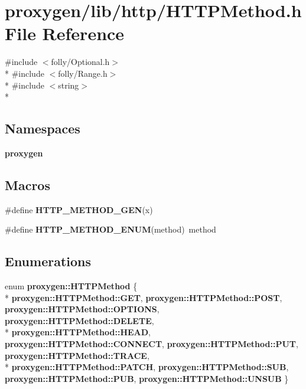\section{proxygen/lib/http/\+H\+T\+T\+P\+Method.h File Reference}
\label{HTTPMethod_8h}
{\ttfamily \#include $<$folly/\+Optional.\+h$>$}\\*
{\ttfamily \#include $<$folly/\+Range.\+h$>$}\\*
{\ttfamily \#include $<$string$>$}\\*
\subsection*{Namespaces}
\begin{DoxyCompactItemize}
\item 
 {\bf proxygen}
\end{DoxyCompactItemize}
\subsection*{Macros}
\begin{DoxyCompactItemize}
\item 
\#define {\bf H\+T\+T\+P\+\_\+\+M\+E\+T\+H\+O\+D\+\_\+\+G\+EN}(x)
\item 
\#define {\bf H\+T\+T\+P\+\_\+\+M\+E\+T\+H\+O\+D\+\_\+\+E\+N\+UM}(method)~method
\end{DoxyCompactItemize}
\subsection*{Enumerations}
\begin{DoxyCompactItemize}
\item 
enum {\bf proxygen\+::\+H\+T\+T\+P\+Method} \{ \\*
{\bf proxygen\+::\+H\+T\+T\+P\+Method\+::\+G\+ET}, 
{\bf proxygen\+::\+H\+T\+T\+P\+Method\+::\+P\+O\+ST}, 
{\bf proxygen\+::\+H\+T\+T\+P\+Method\+::\+O\+P\+T\+I\+O\+NS}, 
{\bf proxygen\+::\+H\+T\+T\+P\+Method\+::\+D\+E\+L\+E\+TE}, 
\\*
{\bf proxygen\+::\+H\+T\+T\+P\+Method\+::\+H\+E\+AD}, 
{\bf proxygen\+::\+H\+T\+T\+P\+Method\+::\+C\+O\+N\+N\+E\+CT}, 
{\bf proxygen\+::\+H\+T\+T\+P\+Method\+::\+P\+UT}, 
{\bf proxygen\+::\+H\+T\+T\+P\+Method\+::\+T\+R\+A\+CE}, 
\\*
{\bf proxygen\+::\+H\+T\+T\+P\+Method\+::\+P\+A\+T\+CH}, 
{\bf proxygen\+::\+H\+T\+T\+P\+Method\+::\+S\+UB}, 
{\bf proxygen\+::\+H\+T\+T\+P\+Method\+::\+P\+UB}, 
{\bf proxygen\+::\+H\+T\+T\+P\+Method\+::\+U\+N\+S\+UB}
 \}
\end{DoxyCompactItemize}
